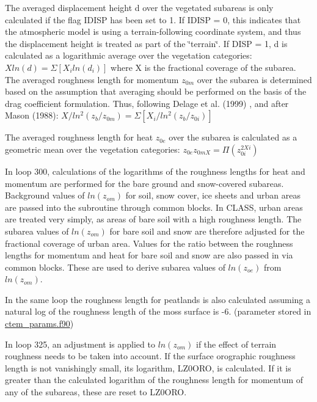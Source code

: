 The averaged displacement height d over the vegetated subareas is only calculated if the flag I\+D\+I\+S\+P has been set to 1. If I\+D\+I\+S\+P = 0, this indicates that the atmospheric model is using a terrain-\/following coordinate system, and thus the displacement height is treated as part of the \char`\"{}terrain\char`\"{}. If D\+I\+S\+P = 1, d is calculated as a logarithmic average over the vegetation categories\+: $X ln(d) = \Sigma [X_i ln(d_i)]$ where X is the fractional coverage of the subarea. The averaged roughness length for momentum $z_{0m}$ over the subarea is determined based on the assumption that averaging should be performed on the basis of the drag coefficient formulation. Thus, following Delage et al. (1999) \cite{Delage1999-vj}, and after Mason (1988)\+: $X/ln^2 (z_b /z_{0m}) = \Sigma [X_i /ln^2 (z_b /z_{0i})]$

The averaged roughness length for heat $z_{0e}$ over the subarea is calculated as a geometric mean over the vegetation categories\+: $z_{0e} z_{0mX} = \Pi ( z_{0i}^{2Xi} )$

In loop 300, calculations of the logarithms of the roughness lengths for heat and momentum are performed for the bare ground and snow-\/covered subareas. Background values of $ln(z_{om})$ for soil, snow cover, ice sheets and urban areas are passed into the subroutine through common blocks. In C\+L\+A\+S\+S, urban areas are treated very simply, as areas of bare soil with a high roughness length. The subarea values of $ln(z_{om})$ for bare soil and snow are therefore adjusted for the fractional coverage of urban area. Values for the ratio between the roughness lengths for momentum and heat for bare soil and snow are also passed in via common blocks. These are used to derive subarea values of $ln(z_{oe})$ from $ln(z_{om})$.

In the same loop the roughness length for peatlands is also calculated assuming a natural log of the roughness length of the moss surface is -\/6. (parameter stored in \hyperlink{ctem__params_8f90}{ctem\+\_\+params.\+f90})

In loop 325, an adjustment is applied to $ln(z_{om})$ if the effect of terrain roughness needs to be taken into account. If the surface orographic roughness length is not vanishingly small, its logarithm, L\+Z0\+O\+R\+O, is calculated. If it is greater than the calculated logarithm of the roughness length for momentum of any of the subareas, these are reset to L\+Z0\+O\+R\+O.

